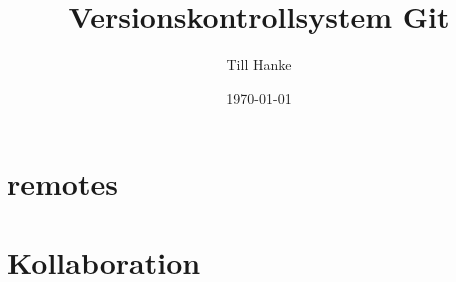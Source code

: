 \documentclass[a4paper]{article}
\title{Versionskontrollsystem Git}\let\Title\@title
\author{Till Hanke}          \let\Author\@author
\date{\today}           \let\Date\@date
\begin{document}

\newpage
\tableofcontents
\newpage


\newpage

%
\newpage

%


%
\section{remotes}
%
\section{Kollaboration} \label{sec:coop}
%
\newpage
\nocite{*}

\printbibliography
\end{document}
